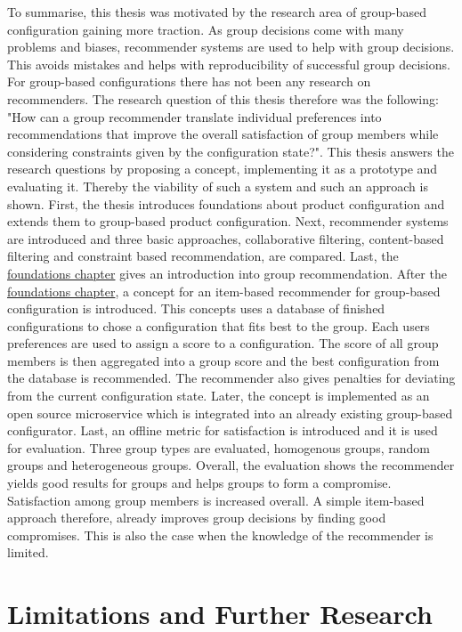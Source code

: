 To summarise, this thesis was motivated by the research area of group-based configuration gaining more traction. As group decisions come with many problems and biases, recommender systems are used  to help with group decisions. This avoids mistakes and helps with reproducibility of successful group decisions. For group-based configurations there has not been any research on recommenders. The research question of this thesis therefore was the following: "How can a group recommender translate individual preferences into recommendations that improve the overall satisfaction of group members while considering constraints given by the configuration state?". This thesis answers the research questions by proposing a concept, implementing it as a prototype and evaluating it. Thereby the viability of such a system and such an approach is shown.
First, the thesis introduces foundations about product configuration and extends them to group-based product configuration. Next, recommender systems are introduced and three basic approaches, collaborative filtering, content-based filtering and constraint based recommendation, are compared. Last, the \hyperref[ch:Foundations]{foundations chapter} gives an introduction into group recommendation.
After the \hyperref[ch:Foundations]{foundations chapter}, a concept for an item-based recommender for group-based configuration is introduced. This concepts uses a database of finished configurations to chose a configuration that fits best to the group. Each users preferences are used to assign a score to a configuration. The score of all group members is then aggregated into a group score and the best configuration from the database is recommended. The recommender also gives penalties for deviating from the current configuration state.
Later, the concept is implemented as an open source microservice which is integrated into an already existing group-based configurator.
Last, an offline metric for satisfaction is introduced and it is used for evaluation. Three group types are evaluated, homogenous groups, random groups and heterogeneous groups. Overall, the evaluation shows the recommender yields good results for groups and helps groups to form a compromise. Satisfaction among group members is increased overall. A simple item-based approach therefore,  already improves group decisions by finding good compromises. This is also the case when the knowledge of the recommender is limited.

\section{Limitations and Further Research}
\label{sec:Conclusion:LimitationsFurtherResearch}

